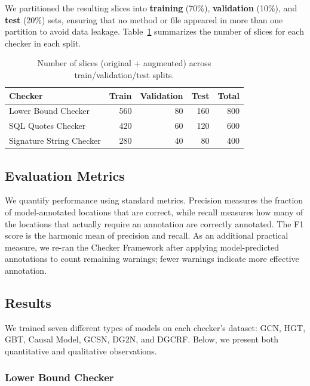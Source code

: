 \documentclass[acmsmall,screen,review,anonymous]{acmart}
\newcommand{\cf}{Checker Framework\xspace}
\begin{document}
We partitioned the resulting slices into \textbf{training} (70\%), \textbf{validation} (10\%), and \textbf{test} (20\%) sets, ensuring that no method or file appeared in more than one partition to avoid data leakage. Table~\ref{tab:splits} summarizes the number of slices for each checker in each split.

\begin{table}[t]
\caption{Number of slices (original + augmented) across train/validation/test splits.}
\label{tab:splits}
\begin{tabular}{lrrrr}
\toprule
\textbf{Checker} & \textbf{Train} & \textbf{Validation} & \textbf{Test} & \textbf{Total} \\
\midrule
Lower Bound Checker & 560 & 80 & 160 & 800 \\
SQL Quotes Checker & 420 & 60 & 120 & 600 \\
Signature String Checker & 280 & 40 & 80 & 400 \\
\bottomrule
\end{tabular}
\end{table}

\subsection{Evaluation Metrics}
\label{sec:metrics}

We quantify performance using standard metrics. Precision measures the fraction of model-annotated locations that are correct, while recall measures how many of the locations that actually require an annotation are correctly annotated. The F1 score is the harmonic mean of precision and recall. As an additional practical measure, we re-ran the \cf after applying model-predicted annotations to count remaining warnings; fewer warnings indicate more effective annotation.

\subsection{Results}
\label{sec:results}

We trained seven different types of models on each checker's dataset: GCN, HGT, GBT, Causal Model, GCSN, DG2N, and DGCRF. Below, we present both quantitative and qualitative observations.

\subsubsection{Lower Bound Checker}
\label{sec:lbresults}
\end{document}
